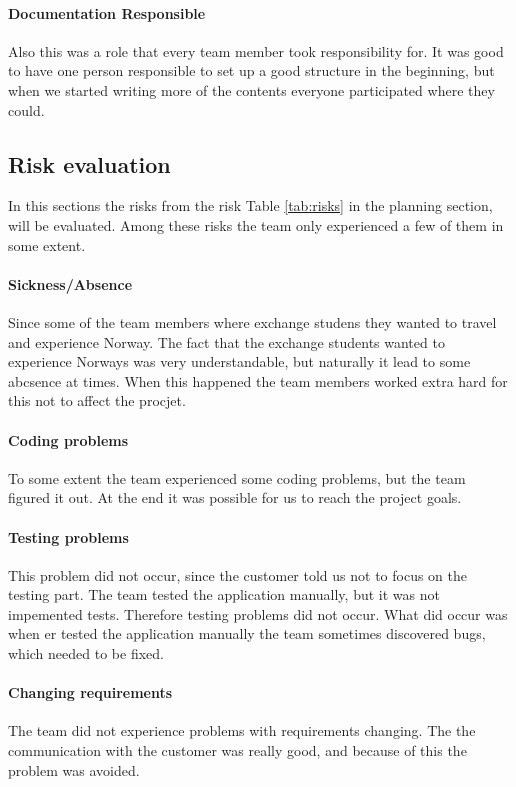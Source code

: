 \paragraph{Documentation Responsible}
Also this was a role that every team member took responsibility for. It was good to have one person responsible to set up a good structure in the beginning, but when we started writing more of the contents everyone participated where they could. 

\subsection{Risk evaluation}
In this sections the risks from the risk Table \ref{tab:risks} in the planning section, will be evaluated. Among these risks the team only experienced a few of them in some extent.

\paragraph{Sickness/Absence}
Since some of the team members where exchange studens they wanted to travel and experience Norway. The fact that the exchange students wanted to experience Norways was very understandable, but naturally it lead to some abcsence at times. When this happened the team members worked extra hard for this not to affect the procjet. 

\paragraph{Coding problems}
To some extent the team experienced some coding problems, but the team figured it out. At the end it was possible for us to reach the project goals. 

\paragraph{Testing problems}
This problem did not occur, since the customer told us not to focus on the testing part. The team tested the application manually, but it was not impemented tests. Therefore testing problems did not occur. What did occur was when er tested the application manually the team sometimes discovered bugs, which needed to be fixed. 
\paragraph{Changing requirements} 
The team did not experience problems with requirements changing. The the communication with the customer was really good, and because of this the problem was avoided.


